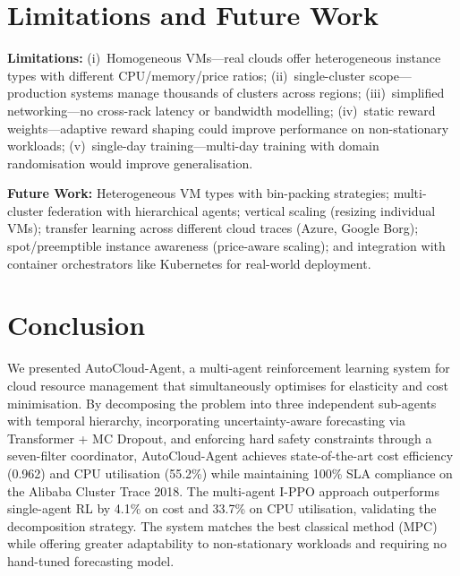 \documentclass[conference]{IEEEtran}
\begin{document}
\section{Limitations and Future Work}

\textbf{Limitations:}
(i)~Homogeneous VMs---real clouds offer heterogeneous instance types with
different CPU/memory/price ratios;
(ii)~single-cluster scope---production systems manage thousands of clusters
across regions;
(iii)~simplified networking---no cross-rack latency or bandwidth modelling;
(iv)~static reward weights---adaptive reward shaping could improve performance
on non-stationary workloads;
(v)~single-day training---multi-day training with domain randomisation would
improve generalisation.

\textbf{Future Work:}
Heterogeneous VM types with bin-packing strategies;
multi-cluster federation with hierarchical agents;
vertical scaling (resizing individual VMs);
transfer learning across different cloud traces (Azure, Google Borg);
spot/preemptible instance awareness (price-aware scaling);
and integration with container orchestrators like Kubernetes for real-world
deployment.

\section{Conclusion}

We presented AutoCloud-Agent, a multi-agent reinforcement learning system for
cloud resource management that simultaneously optimises for elasticity and cost
minimisation.  By decomposing the problem into three independent sub-agents with
temporal hierarchy, incorporating uncertainty-aware forecasting via Transformer
+ MC Dropout, and enforcing hard safety constraints through a seven-filter
coordinator, AutoCloud-Agent achieves state-of-the-art cost efficiency (0.962)
and CPU utilisation (55.2\%) while maintaining 100\% SLA compliance on the
Alibaba Cluster Trace 2018.  The multi-agent I-PPO approach outperforms
single-agent RL by 4.1\% on cost and 33.7\% on CPU utilisation, validating the
decomposition strategy.  The system matches the best classical method (MPC)
while offering greater adaptability to non-stationary workloads and requiring no
hand-tuned forecasting model.
\end{document}
